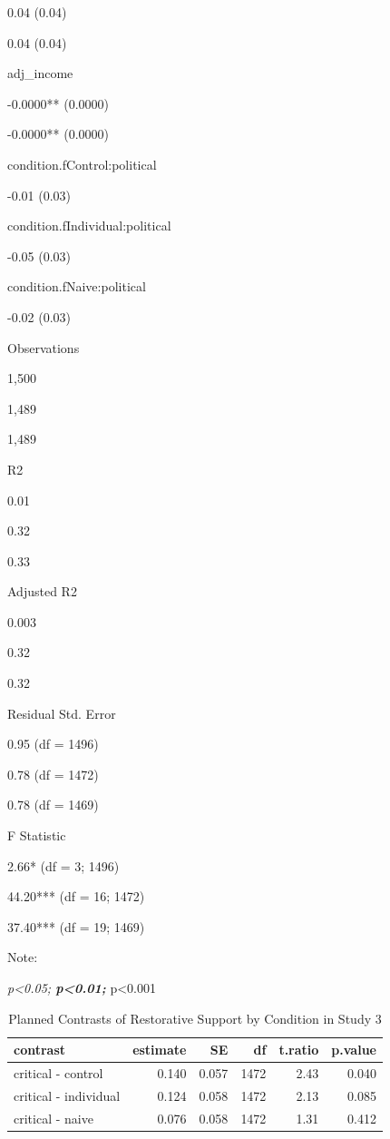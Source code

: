 \documentclass[
]{book}
\begin{document}
0.04 (0.04)

0.04 (0.04)

adj\_income

-0.0000** (0.0000)

-0.0000** (0.0000)

condition.fControl:political

-0.01 (0.03)

condition.fIndividual:political

-0.05 (0.03)

condition.fNaive:political

-0.02 (0.03)

Observations

1,500

1,489

1,489

R2

0.01

0.32

0.33

Adjusted R2

0.003

0.32

0.32

Residual Std. Error

0.95 (df = 1496)

0.78 (df = 1472)

0.78 (df = 1469)

F Statistic

2.66* (df = 3; 1496)

44.20*** (df = 16; 1472)

37.40*** (df = 19; 1469)

Note:

\emph{p\textless0.05; \textbf{p\textless0.01; }}p\textless0.001

\begin{table}

\caption{\label{tab:rest-contrast-s3}Planned Contrasts of Restorative Support by Condition in Study 3}
\centering
\fontsize{13}{15}\selectfont
\begin{tabular}[t]{lrrrrr}
\toprule
contrast & estimate & SE & df & t.ratio & p.value\\
\midrule
critical - control & 0.140 & 0.057 & 1472 & 2.43 & 0.040\\
critical - individual & 0.124 & 0.058 & 1472 & 2.13 & 0.085\\
critical - naive & 0.076 & 0.058 & 1472 & 1.31 & 0.412\\
\bottomrule
\end{tabular}
\end{table}
\end{document}
